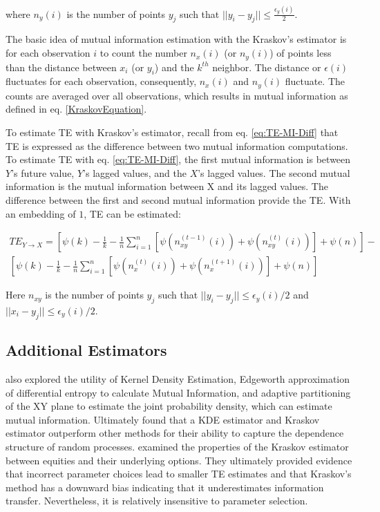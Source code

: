 \noindent where \(n_y(i)\) is the number of points \(y_j\) such that \(|| y_i - y_j || \leq \frac{\epsilon_y(i)}{2} \).

The basic idea of mutual information estimation with the Kraskov's estimator is for each observation \(i\) to count the number \(n_x(i)\) (or \(n_y(i)\)) of points less than the distance between \(x_i\) (or \(y_i\)) and the \(k^{th}\) neighbor. The distance or \(\epsilon(i)\) fluctuates for each observation, consequently, \(n_x(i)\) and \(n_y(i)\) fluctuate. The counts are averaged over all observations, which results in mutual information as defined in eq. \ref{KraskovEquation}.


To estimate TE with Kraskov's estimator, recall from eq. \ref{eq:TE-MI-Diff} that TE is expressed as the difference between two mutual information computations. To estimate TE with eq. \ref{eq:TE-MI-Diff}, the first mutual information is between \(Y\)'s future value, \(Y\)'s lagged values, and the  \(X\)'s lagged values. The second mutual information is the mutual information between X and its lagged values. The difference between the first and second mutual information provide the TE. With an embedding of \(1\), TE can be estimated: 

\setlength{\arraycolsep}{0.0em}
\begin{eqnarray}
TE_{Y \rightarrow X} =  \left[  \psi(k) - \frac{1}{k} - \frac{1}{n}  \sum_{i=1}^n [ \psi(n_{xy}^{(t-1)}(i)) + \psi(n_{xy}^{(t)}(i) ) ] + \psi(n) \right]   -  \nonumber\\
\left[  \psi(k) - \frac{1}{k} - \frac{1}{n}  \sum_{i=1}^n [ \psi(n_{x}^{(t)}(i)) + \psi(n_{x}^{(t+1)}(i) ) ] + \psi(n) \right]
\label{eq:TE-EST}
\end{eqnarray}
\setlength{\arraycolsep}{1pt}

\noindent  Here \(n_{xy}\) is the number of points \(y_j\) such that \(||y_i - y_j  || \leq \epsilon_y(i)/2\) and \(||x_i - y_j  || \leq \epsilon_y(i)/2\).

\subsection{Additional Estimators}
\cite{EstimatingTE} also explored the utility of Kernel Density Estimation, Edgeworth approximation of differential entropy to calculate Mutual Information, and adaptive partitioning of the XY plane to estimate the joint probability density, which can estimate mutual information. Ultimately \cite{EstimatingTE} found that a KDE estimator and Kraskov estimator outperform other methods for their ability to capture the dependence structure of random processes. \cite{JeffTE} examined the properties of the Kraskov estimator between equities and their underlying options. They ultimately provided evidence that incorrect parameter choices lead to smaller TE estimates and that Kraskov's method has a downward bias indicating that it underestimates information transfer. Nevertheless, it is relatively insensitive to parameter selection. 



